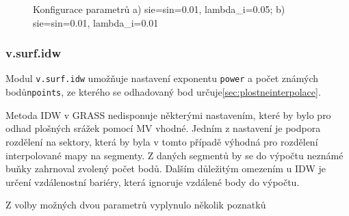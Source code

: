 \documentclass[a4paper,12pt,oneside]{report}
\begin{document}
\begin{figure}[h!]%
    \centering
    \qquad
    \caption[Interpolace Bicubic]{Konfigurace parametrů a) sie=sin=0.01, lambda\_i=0.05; b) sie=sin=0.01, lambda\_i=0.01 \centering}%
    \label{fig:example}%
\end{figure}



\subsubsection*{v.surf.idw}
Modul \texttt{v.surf.idw} umožňuje nastavení exponentu \texttt{power} a počet známých bodů\texttt{npoints}, ze kterého se odhadovaný bod určuje\ref{sec:plostneinterpolace}. 

Metoda IDW v GRASS nedisponuje některými nastavením, které by bylo pro odhad plošných srážek pomocí MV vhodné. Jedním z nastavení je podpora rozdělení na sektory, která by byla v tomto případě výhodná pro rozdělení interpolované mapy na segmenty. Z daných segmentů by se do výpočtu neznámé buňky zahrnoval zvolený počet bodů. Dalším důležitým omezením u IDW je určení vzdálenostní bariéry, která ignoruje vzdálené body do výpočtu.

Z volby možných dvou parametrů vyplynulo několik poznatků
\end{document}
